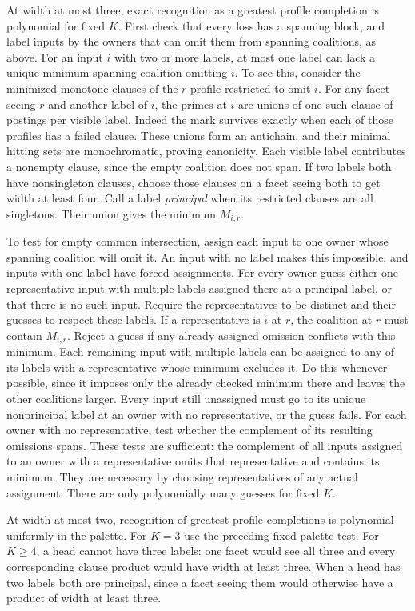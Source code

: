 At width at most three, exact recognition as a greatest profile completion
is polynomial for fixed $K$. First check that every loss has a
spanning block, and label inputs by the owners that can omit
them from spanning coalitions, as above. For an input $i$ with
two or more labels, at most one label can lack a unique
minimum spanning coalition omitting $i$.
To see this, consider the minimized monotone clauses of the
$r$-profile restricted to omit $i$. For any facet seeing $r$
and another label of $i$, the primes at $i$ are unions of one
such clause of postings per visible label. Indeed the mark
survives exactly when each of those profiles has a failed clause.
These unions form an antichain, and their minimal hitting sets
are monochromatic, proving canonicity. Each visible label
contributes a nonempty clause, since the empty coalition does
not span. If two labels both have nonsingleton clauses, choose
those clauses on a facet seeing both to get width at least four.
Call a label \emph{principal} when its restricted clauses are
all singletons. Their union gives the minimum $M_{i,r}$.

To test for empty common intersection, assign each input to
one owner whose spanning coalition will omit it. An input
with no label makes this impossible, and inputs with one
label have forced assignments. For every owner guess either
one representative input with multiple labels assigned there
at a principal label, or that there is no such input. Require
the representatives to be distinct and their guesses to respect
these labels.
If a representative is $i$ at $r$, the coalition at $r$ must
contain $M_{i,r}$. Reject a guess if any already assigned
omission conflicts with this minimum. Each remaining input
with multiple labels can be assigned to any of its labels
with a representative whose minimum excludes it. Do this
whenever possible, since it imposes only the already checked
minimum there and leaves the other coalitions larger. Every
input still unassigned must go to its unique nonprincipal
label at an owner with no representative, or the guess fails.
For each owner with no representative, test whether the
complement of its resulting omissions spans.
These tests are sufficient: the complement of all inputs
assigned to an owner with a representative omits that
representative and contains its minimum. They are necessary
by choosing representatives of any actual assignment.
There are only polynomially many guesses for fixed $K$.

At width at most two, recognition of greatest profile
completions is polynomial uniformly in the palette.
For $K=3$ use the preceding fixed-palette test. For
$K\ge4$, a head cannot have three labels: one facet would
see all three and every corresponding clause product
would have width at least three. When a head has two
labels both are principal, since a facet seeing them
would otherwise have a product of width at least three.

